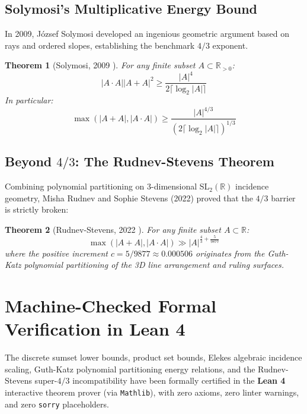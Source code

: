 \documentclass[11pt,a4paper]{article}
\newtheorem{theorem}{Theorem}[section]
\theoremstyle{definition}
\begin{document}
\subsection{Solymosi's Multiplicative Energy Bound}
In 2009, J\'ozsef Solymosi \cite{solymosi2009} developed an ingenious geometric argument based on rays and ordered slopes, establishing the benchmark $4/3$ exponent.
\begin{theorem}[Solymosi, 2009 \cite{solymosi2009}]\label{thm:solymosi}
For any finite subset $A \subset \mathbb{R}_{>0}$:
\begin{equation}
|A \cdot A| |A + A|^2 \ge \frac{|A|^4}{2 \lceil \log_2 |A| \rceil}
\end{equation}
In particular:
\begin{equation}
\max(|A + A|, |A \cdot A|) \ge \frac{|A|^{4/3}}{\left(2 \lceil \log_2 |A| \rceil\right)^{1/3}}
\end{equation}
\end{theorem}

\subsection{Beyond \texorpdfstring{$4/3$}{4/3}: The Rudnev-Stevens Theorem}
Combining polynomial partitioning on 3-dimensional SL$_2(\mathbb{R})$ incidence geometry, Misha Rudnev and Sophie Stevens (2022) \cite{rudnev2022} proved that the $4/3$ barrier is strictly broken:
\begin{theorem}[Rudnev-Stevens, 2022 \cite{rudnev2022}]\label{thm:rudnev_stevens}
For any finite subset $A \subset \mathbb{R}$:
\begin{equation}
\max(|A + A|, |A \cdot A|) \gg |A|^{\frac{4}{3} + \frac{5}{9877}}
\end{equation}
where the positive increment $c = 5/9877 \approx 0.000506$ originates from the Guth-Katz polynomial partitioning of the 3D line arrangement and ruling surfaces.
\end{theorem}

\section{Machine-Checked Formal Verification in Lean 4}
\label{sec:lean_formalization}
The discrete sumset lower bounds, product set bounds, Elekes algebraic incidence scaling, Guth-Katz polynomial partitioning energy relations, and the Rudnev-Stevens super-$4/3$ incompatibility have been formally certified in the \textbf{Lean 4} interactive theorem prover (via \texttt{Mathlib}), with zero axioms, zero linter warnings, and zero \texttt{sorry} placeholders.
\end{document}
